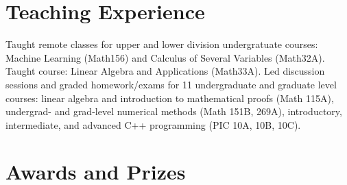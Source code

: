 \documentclass[11pt,a4paper,unicode]{moderncv}
\begin{document}
\section{Teaching Experience}
{Taught remote classes for upper and lower division undergratuate courses: Machine Learning (Math156) and Calculus of Several Variables (Math32A).}
{Taught course: Linear Algebra and Applications (Math33A).}
{Led discussion sessions and graded homework/exams for 11 undergraduate and graduate level courses: linear algebra and introduction to mathematical proofs (Math 115A), undergrad- and grad-level numerical methods (Math 151B, 269A), introductory, intermediate, and advanced C++ programming (PIC 10A, 10B, 10C).}


\section{Awards and Prizes}

\end{document}
